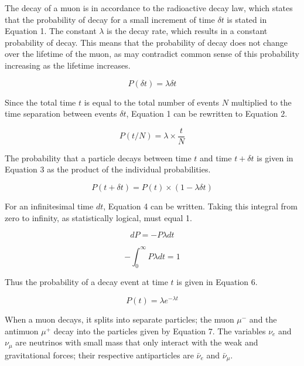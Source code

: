 \documentclass[%
 aip,
 amsmath,amssymb,
 reprint,%
floatfix,
]{revtex4-1}
\begin{document}
The decay of a muon is in accordance to the radioactive decay law, which states that the probability of decay for a small increment of time $\delta t$ is stated in Equation 1. The constant $\lambda$ is the decay rate, which results in a constant probability of decay. This means that the probability of decay does not change over the lifetime of the muon, as may contradict common sense of this probability increasing as the lifetime increases.

\begin{equation}
	P(\delta t) = \lambda \delta t
\end{equation}

Since the total time $t$ is equal to the total number of events $N$ multiplied to the time separation between events $\delta t$, Equation 1 can be rewritten to Equation 2.

\begin{equation}
	P(t/N) = \lambda \times \frac{t}{N}
\end{equation}

The probability that a particle decays between time $t$ and time $t + \delta t$ is given in Equation 3 as the product of the individual probabilities.

\begin{equation}
	P(t+\delta t) = P(t) \times (1-\lambda \delta t)
\end{equation}

For an infinitesimal time $dt$, Equation 4 can be written. Taking this integral from zero to infinity, as statistically logical, must equal 1.

\begin{equation}
	dP = -P \lambda dt
\end{equation}

\begin{equation}
	- \int_{0}^{\infty} P \lambda dt = 1
\end{equation}

Thus the probability of a decay event at time $t$ is given in Equation 6.

\begin{equation}
	P(t) = \lambda e^{-\lambda t}
\end{equation}

When a muon decays, it splits into separate particles; the muon $\mu^-$ and the antimuon $\mu^+$ decay into the particles given by Equation 7. The variables $\nu_e$ and $\nu_\mu$ are neutrinos with small mass that only interact with the weak and gravitational forces; their respective antiparticles are $\bar{\nu}_e$ and $\bar{\nu}_\mu$.
\end{document}
